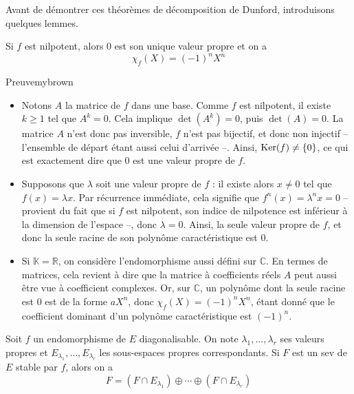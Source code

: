     Avant de démontrer ces théorèmes de décomposition de Dunford, introduisons quelques lemmes.

    \begin{lem}{}{}
        Si $f$ est nilpotent, alors $0$ est son unique valeur propre et on a 
        \[ \chi_f(X) = (-1)^n X^n \]  
    \end{lem}

    \begin{demo}{Preuve}{mybrown}
        \begin{itemize}
            \item Notons $A$ la matrice de $f$ dans une base. Comme $f$ est nilpotent, il existe $k \geq 1$ tel que $A^k = 0$. Cela implique $\det(A^k) = 0$, puis $\det(A) = 0$. La matrice $A$ n’est donc pas inversible, $f$ n’est pas bijectif, et donc non injectif -- l’ensemble de départ étant aussi celui d’arrivée --. Ainsi, $\operatorname{Ker}(f) \neq \left\{0\right\}$, ce qui est exactement dire que $0$ est une valeur propre de $f$. 
            \item Supposons que $\lambda$ soit une valeur propre de $f$ : il existe alors $x \neq 0$ tel que $f(x) = \lambda x$. Par récurrence immédiate, cela signifie que $f^n(x) = \lambda^n x = 0$ -- provient du fait que si $f$ est nilpotent, son indice de nilpotence est inférieur à la dimension de l’espace --, donc $\lambda = 0$. Ainsi, la seule valeur propre de $f$, et donc la seule racine de son polynôme caractéristique est $0$. 
            \item Si $\mathbb{K} = \mathbb{R}$, on considère l’endomorphisme aussi défini sur $\mathbb{C}$. En termes de matrices, cela revient à dire que la matrice à coefficients réels $A$ peut aussi être vue à coefficient complexes. Or, sur $\mathbb{C}$, un polynôme dont la seule racine est $0$ est de la forme $a X^n$, donc $\chi_f(X) = (-1)^n X^n$, étant donné que le coefficient dominant d’un polynôme caractéristique est $(-1)^n$.
        \end{itemize}
    \end{demo}

    \begin{lem}{}{}
        Soit $f$ un endomorphisme de $E$ diagonalisable. On note $\lambda_1,\ldots, \lambda_r$ ses valeurs propres et $E_{\lambda_1}, \ldots, E_{\lambda_r}$ les sous-espaces propres correspondants. Si $F$ est un sev de $E$ stable par $f$, alors on a 
        \[ F = (F \cap E_{\lambda_1}) \oplus \cdots \oplus (F \cap E_{\lambda_{r}}) \]    
    \end{lem}

